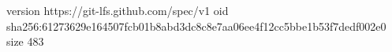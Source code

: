 version https://git-lfs.github.com/spec/v1
oid sha256:61273629e164507fcb01b8abd3dc8c8e7aa06ee4f12cc5bbe1b53f7dedf002e0
size 483
